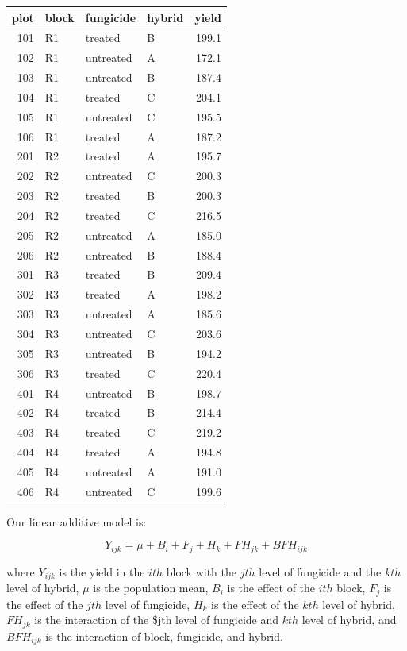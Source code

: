 \documentclass[
]{book}
\begin{document}
\begin{tabular}[t]{r|l|l|l|r}
\hline
plot & block & fungicide & hybrid & yield\\
\hline
101 & R1 & treated & B & 199.1\\
\hline
102 & R1 & untreated & A & 172.1\\
\hline
103 & R1 & untreated & B & 187.4\\
\hline
104 & R1 & treated & C & 204.1\\
\hline
105 & R1 & untreated & C & 195.5\\
\hline
106 & R1 & treated & A & 187.2\\
\hline
201 & R2 & treated & A & 195.7\\
\hline
202 & R2 & untreated & C & 200.3\\
\hline
203 & R2 & treated & B & 200.3\\
\hline
204 & R2 & treated & C & 216.5\\
\hline
205 & R2 & untreated & A & 185.0\\
\hline
206 & R2 & untreated & B & 188.4\\
\hline
301 & R3 & treated & B & 209.4\\
\hline
302 & R3 & treated & A & 198.2\\
\hline
303 & R3 & untreated & A & 185.6\\
\hline
304 & R3 & untreated & C & 203.6\\
\hline
305 & R3 & untreated & B & 194.2\\
\hline
306 & R3 & treated & C & 220.4\\
\hline
401 & R4 & untreated & B & 198.7\\
\hline
402 & R4 & treated & B & 214.4\\
\hline
403 & R4 & treated & C & 219.2\\
\hline
404 & R4 & treated & A & 194.8\\
\hline
405 & R4 & untreated & A & 191.0\\
\hline
406 & R4 & untreated & C & 199.6\\
\hline
\end{tabular}

Our linear additive model is:

\[ Y_{ijk} = \mu + B_i + F_j + H_k + FH_{jk} + BFH_{ijk} \]

where \(Y_{ijk}\) is the yield in the \(ith\) block with the \(jth\) level of fungicide and the \(kth\) level of hybrid, \(\mu\) is the population mean, \(B_i\) is the effect of the \(ith\) block, \(F_j\) is the effect of the \(jth\) level of fungicide, \(H_k\) is the effect of the \(kth\) level of hybrid, \(FH_{jk}\) is the interaction of the \$jth level of fungicide and \(kth\) level of hybrid, and \(BFH_{ijk}\) is the interaction of block, fungicide, and hybrid.
\end{document}
